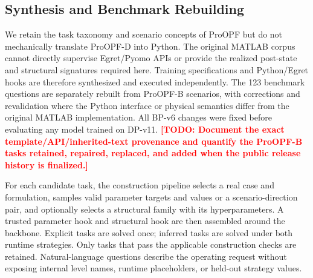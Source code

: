 \documentclass[lettersize,journal]{IEEEtran}
\newcommand{\drafttodo}[1]{\textcolor{red}{\textbf{[TODO: #1]}}}
\begin{document}
\subsection{Synthesis and Benchmark Rebuilding}
We retain the task taxonomy and scenario concepts of ProOPF but do not mechanically translate ProOPF-D into Python. The original MATLAB corpus cannot directly supervise Egret/Pyomo APIs or provide the realized post-state and structural signatures required here. Training specifications and Python/Egret hooks are therefore synthesized and executed independently. The 123 benchmark questions are separately rebuilt from ProOPF-B scenarios, with corrections and revalidation where the Python interface or physical semantics differ from the original MATLAB implementation. All BP-v6 changes were fixed before evaluating any model trained on DP-v11. \drafttodo{Document the exact template/API/inherited-text provenance and quantify the ProOPF-B tasks retained, repaired, replaced, and added when the public release history is finalized.}

For each candidate task, the construction pipeline selects a real case and formulation, samples valid parameter targets and values or a scenario-direction pair, and optionally selects a structural family with its hyperparameters. A trusted parameter hook and structural hook are then assembled around the backbone. Explicit tasks are solved once; inferred tasks are solved under both runtime strategies. Only tasks that pass the applicable construction checks are retained. Natural-language questions describe the operating request without exposing internal level names, runtime placeholders, or held-out strategy values.
\end{document}
